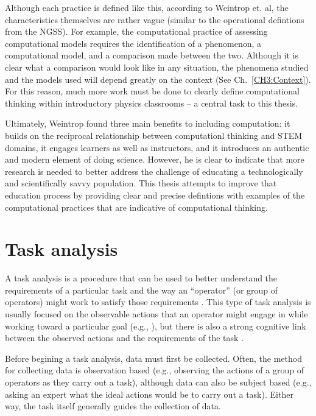 \documentclass{msuphddissertation}
\begin{document}
\begin{doublespace}
Although each practice is defined like this, according to Weintrop et. al, the characteristics themselves are rather vague (similar to the operational defintions from the NGSS).  For example, the computational practice of assessing computational models requires the identification of a phenomenon, a computational model, and a comparison made between the two.  Although it is clear what a comparison would look like in any situation, the phenomena studied and the models used will depend greatly on the context (See Ch.~\ref{CH3:Context}).  For this reason, much more work must be done to clearly define computational thinking within introductory physics classrooms -- a central task to this thesis.

Ultimately, Weintrop found three main benefits to including computation: it builds on the reciprocal relationship between computationl thinking and STEM domains, it engages learners as well as instructors, and it introduces an authentic and modern element of doing science.  However, he is clear to indicate that more research is needed to better address the challenge of educating a technologically and scientifically savvy population.  This thesis attempts to improve that education process by providing clear and precise defintions with examples of the computational practices that are indicative of computational thinking.

\section{Task analysis}

A task analysis is a procedure that can be used to better understand the requirements of a particular task and the way an ``operator'' (or group of operators) might work to satisfy those requirements \cite{Kirwan2005}.  This type of task analysis is usually focused on the observable actions that an operator might engage in while working toward a particular goal (e.g., ), but there is also a strong cognitive link between the observed actions and the requirements of the task \cite{Crandall2006}.

Before begining a task analysis, data must first be collected.  Often, the method for collecting data is observation based (e.g., observing the actions of a group of operators as they carry out a task), although data can also be subject based (e.g., asking an expert what the ideal actions would be to carry out a task).  Either way, the task itself generally guides the collection of data.


\end{doublespace}
\end{document}
